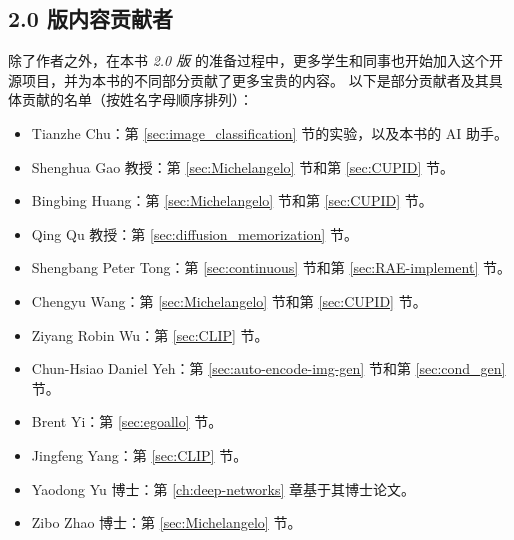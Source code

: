 \documentclass[../../book-main.tex]{subfiles}
\begin{document}
\subsection*{2.0 版内容贡献者}
除了作者之外，在本书 {\em 2.0 版} 的准备过程中，更多学生和同事也开始加入这个开源项目，并为本书的不同部分贡献了更多宝贵的内容。
以下是部分贡献者及其具体贡献的名单（按姓名字母顺序排列）：
\begin{itemize}
    \item Tianzhe Chu：第 \ref{sec:image_classification} 节的实验，以及本书的 AI 助手。
    \item Shenghua Gao 教授：第 \ref{sec:Michelangelo} 节和第 \ref{sec:CUPID} 节。
    \item Bingbing Huang：第 \ref{sec:Michelangelo} 节和第 \ref{sec:CUPID} 节。
    \item Qing Qu 教授：第 \ref{sec:diffusion_memorization} 节。
    \item Shengbang Peter Tong：第 \ref{sec:continuous} 节和第 \ref{sec:RAE-implement} 节。
    \item Chengyu Wang：第 \ref{sec:Michelangelo} 节和第 \ref{sec:CUPID} 节。
    \item Ziyang Robin Wu：第 \ref{sec:CLIP} 节。
    \item Chun-Hsiao Daniel Yeh：第 \ref{sec:auto-encode-img-gen} 节和第 \ref{sec:cond_gen} 节。
    \item Brent Yi：第 \ref{sec:egoallo} 节。
    \item Jingfeng Yang：第 \ref{sec:CLIP} 节。
    \item Yaodong Yu 博士：第 \ref{ch:deep-networks} 章基于其博士论文。
    \item Zibo Zhao 博士：第 \ref{sec:Michelangelo} 节。

\end{itemize}
\end{document}

